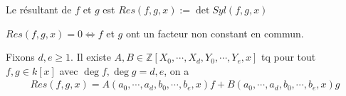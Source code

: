             \begin{defi}
                Le résultant de $f$ et $g$ est $Res(f,g,x) := \det Syl(f,g,x)$
            \end{defi}
            \begin{prop}
                $Res(f,g,x) = 0 \iff f$ et $g$ ont un facteur non constant en commun.
            \end{prop}
            \begin{prop}
                Fixons $d,e \geq 1$. Il existe $A,B \in \mathbb{Z}[X_0, \cdots, X_d, Y_0, \cdots, Y_e, x]$ tq pour tout $f,g \in k[x]$ avec $\deg f , \deg g = d,e$, on a 
                \begin{align*}
                    Res(f,g,x) = A(a_0, \cdots, a_d, b_0, \cdots, b_e, x) f +  B(a_0, \cdots, a_d, b_0, \cdots, b_e, x) g
                \end{align*}
            \end{prop}
